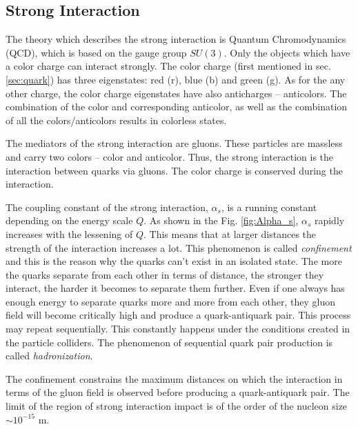 \subsection{Strong Interaction}\label{sec:strong_int}

The theory which describes the strong interaction is Quantum Chromodynamics (QCD), which is based on the gauge group $SU(3)$. Only the
objects which have a color charge can interact strongly. The color charge (first mentioned in sec. \ref{sec:quark}) has three eigenstates:
red (r), blue (b) and green (g). As for the any other charge, the color charge eigenstates have also anticharges -- anticolors. The combination
of the color and corresponding anticolor, as well as the combination of all the colors/anticolors results in colorless states.

The mediators of the strong interaction are gluons. These particles are massless and carry two colors -- color and anticolor. Thus, the strong 
interaction is the interaction between quarks via gluons. The color charge is conserved during the interaction.

The coupling constant of the strong interaction, $\alpha_{s}$, is a running constant depending on the energy scale $Q$. As shown in the
Fig. \ref{fig:Alpha_s}, $\alpha_{s}$ rapidly increases with the lessening of $Q$. This means that at larger distances 
the strength of the interaction increases a lot. This phenomenon is called \textit{confinement} and this is the reason why the quarks
can't exist in an isolated state. The more the quarks separate from each other in terms of distance, the stronger they interact, the harder
it becomes to separate them further. Even if one always has enough energy to separate quarks more and more from each other, they gluon field will become critically
high and produce a quark-antiquark pair. This process may repeat sequentially. This constantly happens under the conditions created in the
particle colliders. The phenomenon of sequential quark pair production is called \textit{hadronization}.

The confinement constrains the maximum distances on which the interaction in terms of the gluon field is observed before producing a quark-antiquark pair.
The limit of the region of strong interaction impact is of the order of the nucleon size $\sim 10^{-15}$ m.

